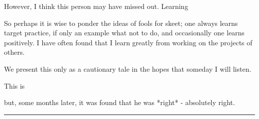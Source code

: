 \documentclass[paper.tex]{subfiles}
\begin{document}
However, I think this person may have missed out. Learning 

So perhaps it is wise to ponder the ideas of fools for skeet; one always learns target practice, if only an example what not to do, and occasionally one learns positively. I have often found that I learn greatly from working on the projects of others.

We present this only as a cautionary tale in the hopes that someday I will listen.

 This is 

but, some months later, it was found that he was *right* - absolutely right.

\rule{\linewidth}{0.2pt}

\end{document}
